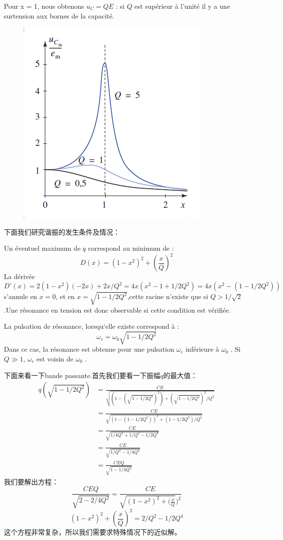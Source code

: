 \documentclass[12pt]{book}
\theoremstyle{definition}\newtheorem{dfn}{Définition}[chapter]
\theoremstyle{plain}\newtheorem{thm}{Théorème}[chapter]
\theoremstyle{plain}\newtheorem{prp}{Proposition}[chapter]
\theoremstyle{plain}\newtheorem{lem}{\bf Lemme}[chapter]
\theoremstyle{plain}\newtheorem{axm}{\bf Axiome}[chapter]
\theoremstyle{plain}\newtheorem{lmm}{\bf Lemme}[chapter]
\theoremstyle{plain}\newtheorem{cor}{\bf Corollaire}[chapter]
\theoremstyle{remark}\newtheorem{rem}{Remarque}[chapter]
\begin{document}
Pour x = 1, nous obtenons $u_C = QE$ : si $Q$ est supérieur à l'unité il y a une {\color{red}surtension}
aux bornes de la capacité.

\begin{figure}[H]
	\centering
	\includegraphics[scale=1]{image//Etude du circuit RLC serie-Resonances//8}
\end{figure}

下面我们研究谐振的发生条件及情况：

Un éventuel maximum de $q$ correspond au minimum de :
$$
D(x)=(1-x^2)^2+(\frac{x}{Q})^2
$$
La dérivée
 $$D'(x)=2(1-x^2)(-2x)+2x/Q^2=4x(x^2-1+1/2Q^2)=4x(x^2-(1-1/2Q^2))$$
  s'annule en $x = 0$, et en $x=\sqrt{1-1/2Q^2}$,cette racine n'existe que si $Q>1/\sqrt{2}$.Une résonance en tension est donc observable si cette condition est vérifiée.

La pulsation de résonance, lorsqu‘elle existe correspond à :
$$
\omega_r=\omega_0\sqrt{1-1/2Q^2}
$$
Dans ce cas, la résonance est obtenue pour une pulsation $\omega_r$ inférieure
à $\omega_0$ . Si $Q\gg1$, $\omega_r$ est voisin de $\omega_0$ .

下面来看一下bande passante.首先我们要看一下振幅$q$的最大值：
$$
\begin{aligned}
q(\sqrt{1-1/2Q^2})&=\frac{CE}{\sqrt{(1-(\sqrt{1-1/2Q^2})^2)+(\sqrt{1-1/2Q^2})^2/Q^2}}\\
&=\frac{CE}{\sqrt{(1-(1-1/2Q^2))^2+(1-1/2Q^2)/Q^2}}\\
&=\frac{CE}{\sqrt{1/4Q^4+1/Q^2-1/2Q^4}}\\
&=\frac{CE}{\sqrt{1/Q^2-1/4Q^4}}\\
&=\frac{CEQ}{\sqrt{1-1/4Q^2}}
\end{aligned}
$$
我们要解出方程：
$$
\frac{CEQ}{\sqrt{2-2/4Q^2}}=\frac{CE}{\sqrt{(1-x^2)^2+(\frac{x}{Q}})^2}
$$
$$
(1-x^2)^2+(\frac{x}{Q})^2=2/Q^2-1/2Q^4
$$
这个方程非常复杂，所以我们需要求特殊情况下的近似解。
\end{document}
